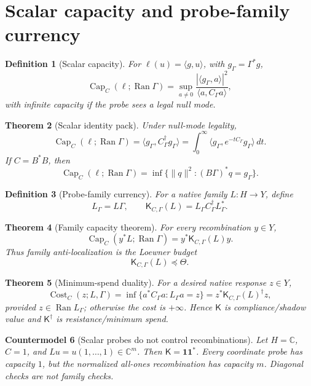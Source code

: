 \documentclass[11pt]{article}
\newtheorem{theorem}{Theorem}[section]
\newtheorem{definition}[theorem]{Definition}
\newtheorem{countermodel}[theorem]{Countermodel}
\DeclareMathOperator{\range}{Ran}
\DeclareMathOperator{\Cost}{Cost}
\DeclareMathOperator{\Capacity}{Cap}
\newcommand{\K}{\mathsf K}
\newcommand{\Loewner}{\preceq}
\begin{document}
\section{Scalar capacity and probe-family currency}

\begin{definition}[Scalar capacity]
For \(\ell(u)=\langle g,u\rangle\), with \(g_\Gamma=\Gamma^*g\),
\[
  \Capacity_C(\ell;\range\Gamma)=
  \sup_{a\ne0}\frac{|\langle g_\Gamma,a\rangle|^2}{\langle a,C_\Gamma a\rangle},
\]
with infinite capacity if the probe sees a legal null mode.
\end{definition}

\begin{theorem}[Scalar identity pack]
Under null-mode legality,
\[
  \Capacity_C(\ell;\range\Gamma)=\langle g_\Gamma,C_\Gamma^\dagger g_\Gamma\rangle
  =\int_0^\infty\langle g_\Gamma,e^{-tC_\Gamma}g_\Gamma\rangle\,dt.
\]
If \(C=B^*B\), then
\[
  \Capacity_C(\ell;\range\Gamma)=\inf\{\|q\|^2:(B\Gamma)^*q=g_\Gamma\}.
\]
\end{theorem}

\begin{definition}[Probe-family currency]
For a native family \(L:H\to Y\), define
\[
  L_\Gamma=L\Gamma,
  \qquad
  \K_{C,\Gamma}(L)=L_\Gamma C_\Gamma^\dagger L_\Gamma^*.
\]
\end{definition}

\begin{theorem}[Family capacity theorem]
For every recombination \(y\in Y\),
\[
  \Capacity_C(y^*L;\range\Gamma)=y^*\K_{C,\Gamma}(L)y.
\]
Thus family anti-localization is the Loewner budget
\[
  \K_{C,\Gamma}(L)\Loewner\Theta.
\]
\end{theorem}

\begin{theorem}[Minimum-spend duality]
For a desired native response \(z\in Y\),
\[
  \Cost_C(z;L,\Gamma)=\inf\{a^*C_\Gamma a:L_\Gamma a=z\}
  =z^*\K_{C,\Gamma}(L)^\dagger z,
\]
provided \(z\in\range L_\Gamma\); otherwise the cost is \(+\infty\).  Hence \(\K\) is compliance/shadow value and \(\K^\dagger\) is resistance/minimum spend.
\end{theorem}

\begin{countermodel}[Scalar probes do not control recombinations]
Let \(H=\mathbb C\), \(C=1\), and \(Lu=u(1,\ldots,1)\in\mathbb C^m\).  Then \(\K=\mathbf 1\mathbf 1^*\).  Every coordinate probe has capacity \(1\), but the normalized all-ones recombination has capacity \(m\).  Diagonal checks are not family checks.
\end{countermodel}
\end{document}
